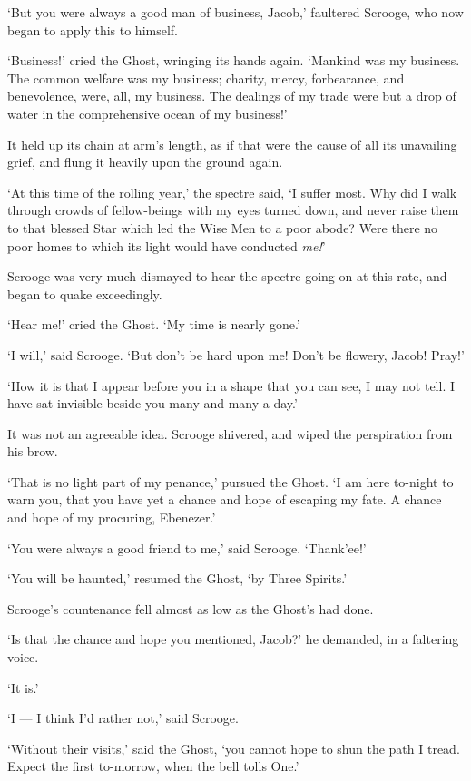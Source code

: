 \documentclass[11pt,twoside]{article}\makeatletter
\begin{document}
‘But you were always a good man of business, Jacob,’ faultered Scrooge, who now began to apply this to himself.  \par
‘Business!’ cried the Ghost, wringing its hands again.  ‘Mankind was my business.  The common welfare was my business; charity, mercy, forbearance, and benevolence, were, all, my business.  The dealings of my trade were but a drop of water in the comprehensive ocean of my business!’\par
It held up its chain at arm's length, as if that were the cause of all its unavailing grief, and flung it heavily upon the ground again.  \par
‘At this time of the rolling year,’ the spectre said, ‘I suffer most.  Why did I walk through crowds of fellow-beings with my eyes turned down, and never raise them to that blessed Star which led the Wise Men to a poor abode? Were there no poor homes to which its light would have conducted \textit{me!}’\par
Scrooge was very much dismayed to hear the spectre going on at this rate, and began to quake exceedingly. \par
‘Hear me!’ cried the Ghost.  ‘My time is nearly gone.’\par
‘I will,’ said Scrooge.  ‘But don't be hard upon me! Don't be flowery, Jacob!  Pray!’\par
‘How it is that I appear before you in a shape that you can see, I may not tell.  I have sat invisible beside you many and many a day.’\par
It was not an agreeable idea.  Scrooge shivered, and wiped the perspiration from his brow.  \par
‘That is no light part of my penance,’ pursued the Ghost.  ‘I am here to-night to warn you, that you have yet a chance and hope of escaping my fate.  A chance and hope of my procuring, Ebenezer.’\par
‘You were always a good friend to me,’ said Scrooge.  ‘Thank'ee!’\par
‘You will be haunted,’ resumed the Ghost, ‘by Three Spirits.’\par
Scrooge's countenance fell almost as low as the Ghost's had done.  \par
‘Is that the chance and hope you mentioned, Jacob?’ he demanded, in a faltering voice.  \par
‘It is.’\par
‘I — I think I'd rather not,’ said Scrooge. \par
‘Without their visits,’ said the Ghost, ‘you cannot hope to shun the path I tread.  Expect the first to-morrow, when the bell tolls One.’\par
\end{document}
